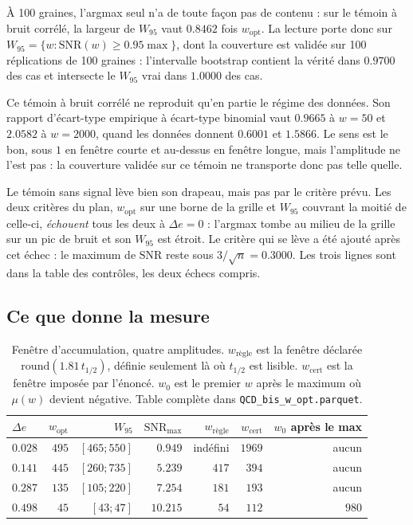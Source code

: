 \documentclass[11pt,a4paper]{article}
\begin{document}
À 100 graines, l'argmax seul n'a de toute façon pas de contenu : sur le témoin à bruit
corrélé, la largeur de $W_{95}$ vaut $0.8462$ fois $w_{\mathrm{opt}}$. La lecture porte donc
sur $W_{95} = \{w : \mathrm{SNR}(w) \geq 0.95 \max\}$, dont la couverture est validée sur
100 réplications de 100 graines : l'intervalle bootstrap contient la vérité dans $0.9700$ des
cas et intersecte le $W_{95}$ vrai dans $1.0000$ des cas.

Ce témoin à bruit corrélé ne reproduit qu'en partie le régime des données. Son rapport
d'écart-type empirique à écart-type binomial vaut $0.9665$ à $w = 50$ et $2.0582$ à
$w = 2000$, quand les données donnent $0.6001$ et $1.5866$. Le sens est le bon, sous $1$ en
fenêtre courte et au-dessus en fenêtre longue, mais l'amplitude ne l'est pas : la couverture
validée sur ce témoin ne transporte donc pas telle quelle.

Le témoin sans signal lève bien son drapeau, mais pas par le critère prévu. Les deux critères
du plan, $w_{\mathrm{opt}}$ sur une borne de la grille et $W_{95}$ couvrant la moitié de
celle-ci, \emph{échouent} tous les deux à $\Delta e = 0$ : l'argmax tombe au milieu de la
grille sur un pic de bruit et son $W_{95}$ est étroit. Le critère qui se lève a été ajouté
après cet échec : le maximum de $\mathrm{SNR}$ reste sous $3/\sqrt{n} = 0.3000$. Les trois
lignes sont dans la table des contrôles, les deux échecs compris.

\subsection{Ce que donne la mesure}

\begin{table}[htbp]
  \centering
  \begin{tabular}{lrrrrrr}
    \toprule
    $\Delta e$ & $w_{\mathrm{opt}}$ & $W_{95}$ & $\mathrm{SNR}_{\max}$
    & $w_{\text{règle}}$ & $w_{\mathrm{cert}}$ & $w_0$ après le max \\
    \midrule
    $0.028$ & $495$ & $[465 ; 550]$ & $0.949$  & indéfini & $1969$ & aucun \\
    $0.141$ & $445$ & $[260 ; 735]$ & $5.239$  & $417$    & $394$  & aucun \\
    $0.287$ & $135$ & $[105 ; 220]$ & $7.254$  & $181$    & $193$  & aucun \\
    $0.498$ & $45$  & $[43 ; 47]$   & $10.215$ & $54$     & $112$  & $980$ \\
    \bottomrule
  \end{tabular}
  \caption{Fenêtre d'accumulation, quatre amplitudes. $w_{\text{règle}}$ est la fenêtre
  déclarée $\mathrm{round}(1.81\,t_{1/2})$, définie seulement là où $t_{1/2}$ est lisible.
  $w_{\mathrm{cert}}$ est la fenêtre imposée par l'énoncé. $w_0$ est le premier $w$ après le
  maximum où $\mu(w)$ devient négative. Table complète dans
  \texttt{QCD\_bis\_w\_opt.parquet}.}
\end{table}
\end{document}
